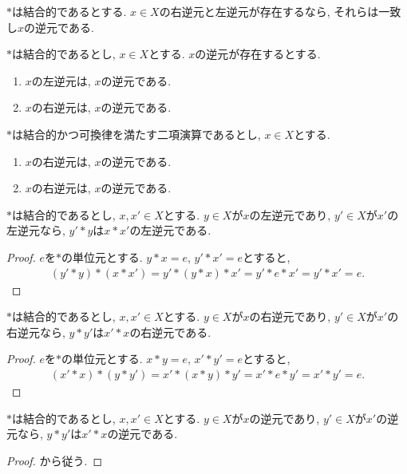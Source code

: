 \begin{cor}
  $\ast$は結合的であるとする.
  $x\in X$の右逆元と左逆元が存在するなら,
  それらは一致し$x$の逆元である.
\end{cor}
\begin{cor}
  $\ast$は結合的であるとし,
  $x\in X$とする.
  $x$の逆元が存在するとする.
  \begin{enumerate}
  \item $x$の左逆元は, $x$の逆元である.
  \item $x$の右逆元は, $x$の逆元である.
  \end{enumerate}
\end{cor}
\begin{cor}
  $\ast$は結合的かつ可換律を満たす二項演算であるとし,
  $x\in X$とする.
  \begin{enumerate}
  \item $x$の右逆元は, $x$の逆元である.
  \item $x$の右逆元は, $x$の逆元である.
  \end{enumerate}
\end{cor}


\begin{lemma}
\label{lem:prod:inv:l}
  $\ast$は結合的であるとし,
  $x,x'\in X$とする.
  $y\in X$が$x$の左逆元であり,
  $y'\in X$が$x'$の左逆元なら,
  $y'\ast y$は$x\ast x'$の左逆元である.
\end{lemma}
\begin{proof}
  $e$を$\ast$の単位元とする.
  $y\ast x=e$,   $y'\ast x'=e$とすると,
  \begin{align*}
  (y'\ast y)\ast (x\ast x')=y'\ast (y\ast x)\ast x'=y'\ast e\ast x' =y'\ast x'=e.
  \end{align*}
\end{proof}

\begin{lemma}
\label{lem:prod:inv:r}
  $\ast$は結合的であるとし,
  $x,x'\in X$とする.
  $y\in X$が$x$の右逆元であり,
  $y'\in X$が$x'$の右逆元なら,
  $y\ast y'$は$x'\ast x$の右逆元である.
\end{lemma}
\begin{proof}
  \label{lem:prod:inv}
  $e$を$\ast$の単位元とする.
  $x\ast y=e$,   $x'\ast y'=e$とすると,
  \begin{align*}
  (x'\ast x)\ast (y\ast y')=x'\ast (x\ast y)\ast y'=x'\ast e\ast y' =x'\ast y'=e.
  \end{align*}
\end{proof}

\begin{lemma}
  $\ast$は結合的であるとし,
  $x,x'\in X$とする.
  $y\in X$が$x$の逆元であり,
  $y'\in X$が$x'$の逆元なら,
  $y\ast y'$は$x'\ast x$の逆元である.
\end{lemma}
\begin{proof}
から従う.
\end{proof}


